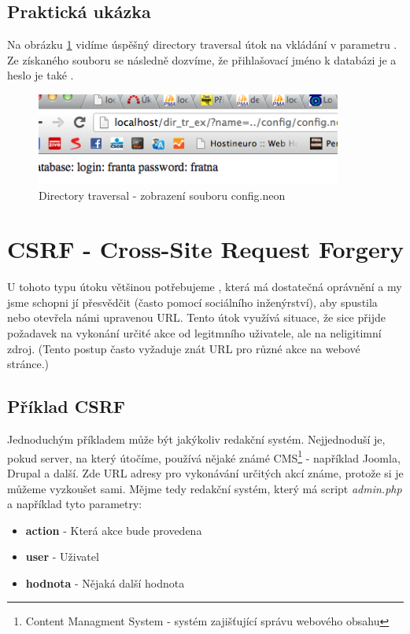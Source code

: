 \documentclass[12pt, a4paper]{report}
\begin{document}
\subsection{Praktická ukázka}
Na obrázku \ref{obr.directory} vidíme úspěšný directory traversal útok na vkládání v parametru . Ze získaného souboru  se následně dozvíme, že přihlašovací jméno k databázi je  a heslo je také .
\begin{figure}[h!]
\centerline{\includegraphics[width=380px]{./examples/dir_example.png}}
\caption{Directory traversal - zobrazení souboru config.neon}
\label{obr.directory}
\end{figure}

\section{CSRF - Cross-Site Request Forgery}
U tohoto typu útoku většinou potřebujeme , která má dostatečná oprávnění a my jsme schopni jí přesvědčit (často pomocí sociálního inženýrství), aby spustila nebo otevřela námi upravenou URL. Tento útok využívá situace, že sice přijde požadavek na vykonání určité akce od legitmního uživatele, ale na neligitimní zdroj. (Tento postup často vyžaduje znát URL pro různé akce na webové stránce.)
\subsection{Příklad CSRF}
Jednoduchým příkladem může být jakýkoliv redakční systém. Nejjednoduší je, pokud server, na který útočíme, používá nějaké známé CMS\footnote{Content Managment System - systém zajišťující správu webového obsahu} - například Joomla, Drupal a další. Zde URL adresy pro vykonávání určitých akcí známe, protože si je můžeme vyzkoušet sami. Mějme tedy redakční systém, který má script \textit{admin.php} a například tyto parametry:
\begin{itemize}
\item \textbf{action} - Která akce bude provedena
\item \textbf{user} - Uživatel
\item \textbf{hodnota} - Nějaká další hodnota
\end{itemize}
\end{document}
